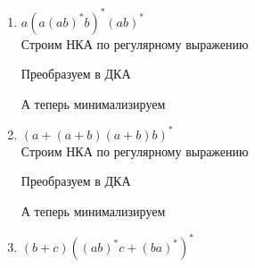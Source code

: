 \documentclass{article}
\begin{document}
\begin{enumerate}
    \item \(a(a(ab)^{*}b)^{*}(ab)^{*}\)\\
    Строим НКА по регулярному выражению
    \begin{center}
            \begin{figure}[htbp]
                \centering
                
            \end{figure}
        \end{center}
    \newpage
    Преобразуем в ДКА 
     \begin{center}
            \begin{figure}[htbp]
                \centering
                
            \end{figure}
        \end{center}
    А теперь минимализируем      
    \begin{center}
            \begin{figure}[htbp]
                \centering
                
            \end{figure}
        \end{center}    
    \item \((a + (a + b)(a + b)b)^*\)\\
    Строим НКА по регулярному выражению
    \begin{center}
            \begin{figure}[htbp]
                \centering
                
            \end{figure}
        \end{center}
    \newpage
    Преобразуем в ДКА 
     \begin{center}
            \begin{figure}[htbp]
                \centering
                
            \end{figure}
        \end{center}
    А теперь минимализируем      
    \begin{center}
            \begin{figure}[htbp]
                \centering
                
            \end{figure}
        \end{center}
    \newpage
    \item \((b+c)((ab)^*c + (ba)^*)^*\)\\

\end{enumerate}
\end{document}
